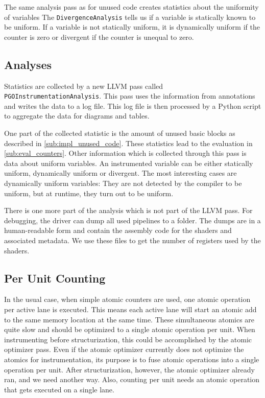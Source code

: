 The same analysis pass as for unused code creates statistics about the uniformity of variables
The \texttt{DivergenceAnalysis} tells us if a variable is statically known to be uniform.
If a variable is not statically uniform, it is dynamically uniform if the counter is zero or divergent if the counter is unequal to zero.

\subsection{Analyses}
\label{sub:impl_analysis}
Statistics are collected by a new LLVM pass called \texttt{PGOInstrumentationAnalysis}.
This pass uses the information from annotations and writes the data to a log file.
This log file is then processed by a Python script to aggregate the data for diagrams and tables.

One part of the collected statistic is the amount of unused basic blocks as described in \cref{sub:impl_unused_code}.
These statistics lead to the evaluation in \cref{sub:eval_counters}.
Other information which is collected through this pass is data about uniform variables.
An instrumented variable can be either statically uniform, dynamically uniform or divergent.
The most interesting cases are dynamically uniform variables: They are not detected by the compiler to be uniform, but at runtime, they turn out to be uniform.

There is one more part of the analysis which is not part of the LLVM pass.
For debugging, the driver can dump all used pipelines to a folder.
The dumps are in a human-readable form and contain the assembly code for the shaders and associated metadata.
We use these files to get the number of registers used by the shaders.

\subsection{Per Unit Counting}
\label{sub:impl_per_unit}
In the usual case, when simple atomic counters are used, one atomic operation per active lane is executed.
This means each active lane will start an atomic add to the same memory location at the same time.
These simultaneous atomics are quite slow and should be optimized to a single atomic operation per unit.
When instrumenting before structurization, this could be accomplished by the atomic optimizer pass.
Even if the atomic optimizer currently does not optimize the atomics for instrumentation, its purpose is to fuse atomic operations into a single operation per unit.
After structurization, however, the atomic optimizer already ran, and we need another way.
Also, counting per unit needs an atomic operation that gets executed on a single lane.

